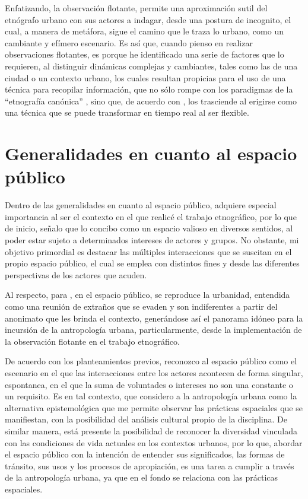 \documentclass[
  spanish,
  11pt,
  a4paper,
]{scrbook}
\begin{document}
Enfatizando, la observación flotante, permite una aproximación sutil del
etnógrafo urbano con sus actores a indagar, desde una postura de
incognito, el cual, a manera de metáfora, sigue el camino que le traza
lo urbano, como un cambiante y efímero escenario. Es así que, cuando
pienso en realizar observaciones flotantes, es porque he identificado
una serie de factores que lo requieren, al distinguir dinámicas
complejas y cambiantes, tales como las de una ciudad o un contexto
urbano, los cuales resultan propicias para el uso de una técnica para
recopilar información, que no sólo rompe con los paradigmas de la
``etnografía canónica'' \autocite{Godelier1995}, sino que, de acuerdo
con \textcite{Delgado1999}, los trasciende al erigirse como una técnica
que se puede transformar en tiempo real al ser flexible.

\section*{Generalidades en cuanto al espacio
público}\label{generalidades-en-cuanto-al-espacio-puxfablico}


Dentro de las generalidades en cuanto al espacio público, adquiere
especial importancia al ser el contexto en el que realicé el trabajo
etnográfico, por lo que de inicio, señalo que lo concibo como un espacio
valioso en diversos sentidos, al poder estar sujeto a determinados
intereses de actores y grupos. No obstante, mi objetivo primordial es
destacar las múltiples interacciones que se suscitan en el propio
espacio público, el cual se emplea con distintos fines y desde las
diferentes perspectivas de los actores que acuden.

Al respecto, para \textcite{Delgado2002}, en el espacio público, se
reproduce la urbanidad, entendida como una reunión de extraños que se
evaden y son indiferentes a partir del anonimato que les brinda el
contexto, generándose así el panorama idóneo para la incursión de la
antropología urbana, particularmente, desde la implementación de la
observación flotante en el trabajo etnográfico.

De acuerdo con los planteamientos previos, reconozco al espacio público
como el escenario en el que las interacciones entre los actores
acontecen de forma singular, espontanea, en el que la suma de voluntades
o intereses no son una constante o un requisito. Es en tal contexto, que
considero a la antropología urbana como la alternativa epistemológica
que me permite observar las prácticas espaciales que se manifiestan, con
la posibilidad del análisis cultural propio de la disciplina. De similar
manera, está presente la posibilidad de reconocer la diversidad
vinculada con las condiciones de vida actuales en los contextos urbanos,
por lo que, abordar el espacio público con la intención de entender sus
significados, las formas de tránsito, sus usos y los procesos de
apropiación, es una tarea a cumplir a través de la antropología urbana,
ya que en el fondo se relaciona con las prácticas espaciales.
\end{document}
